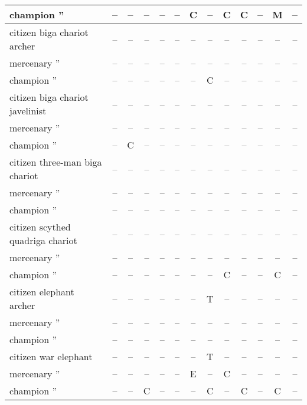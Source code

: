 \documentclass{article}
\begin{document}
\begin{tabular}{l|cccc|cccc|cccc}
champion  ''                          & -- & -- & -- & -- & -- & C  & -- & C  & C  & -- & M  & -- \\
\hline
citizen biga chariot archer           & -- & -- & -- & -- & -- & -- & -- & -- & -- & -- & -- & -- \\
mercenary ''                          & -- & -- & -- & -- & -- & -- & -- & -- & -- & -- & -- & -- \\
champion  ''                          & -- & -- & -- & -- & -- & -- & C  & -- & -- & -- & -- & -- \\
\hline
citizen biga chariot javelinist       & -- & -- & -- & -- & -- & -- & -- & -- & -- & -- & -- & -- \\
mercenary ''                          & -- & -- & -- & -- & -- & -- & -- & -- & -- & -- & -- & -- \\
champion  ''                          & -- & C  & -- & -- & -- & -- & -- & -- & -- & -- & -- & -- \\
\hline
citizen three-man biga chariot        & -- & -- & -- & -- & -- & -- & -- & -- & -- & -- & -- & -- \\
mercenary ''                          & -- & -- & -- & -- & -- & -- & -- & -- & -- & -- & -- & -- \\
champion  ''                          & -- & -- & -- & -- & -- & -- & -- & -- & -- & -- & -- & -- \\
\hline
citizen scythed quadriga chariot      & -- & -- & -- & -- & -- & -- & -- & -- & -- & -- & -- & -- \\
mercenary ''                          & -- & -- & -- & -- & -- & -- & -- & -- & -- & -- & -- & -- \\
champion  ''                          & -- & -- & -- & -- & -- & -- & -- & C  & -- & -- & C  & -- \\
\hline
citizen elephant archer               & -- & -- & -- & -- & -- & -- & T  & -- & -- & -- & -- & -- \\
mercenary ''                          & -- & -- & -- & -- & -- & -- & -- & -- & -- & -- & -- & -- \\
champion ''                           & -- & -- & -- & -- & -- & -- & -- & -- & -- & -- & -- & -- \\
\hline
citizen war elephant                  & -- & -- & -- & -- & -- & -- & T  & -- & -- & -- & -- & -- \\
mercenary ''                          & -- & -- & -- & -- & -- & E  & -- & C  & -- & -- & -- & -- \\
champion  ''                          & -- & -- & C  & -- & -- & -- & C  & -- & C  & -- & C  & -- \\
\end{tabular}
\end{document}
